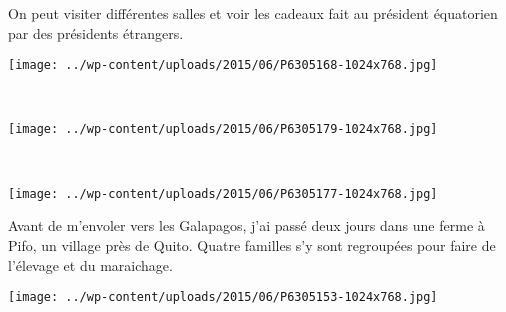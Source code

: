 On peut visiter différentes salles et voir les cadeaux fait au président équatorien par des présidents étrangers. 
\begin{center} 
\texttt{[image: ../wp-content/uploads/2015/06/P6305168-1024x768.jpg]} 
\end{center}
\vspace{-\topsep}
\pagebreak
~
\begin{center} 
\texttt{[image: ../wp-content/uploads/2015/06/P6305179-1024x768.jpg]} 
\end{center}
~\\
\begin{center} 
\texttt{[image: ../wp-content/uploads/2015/06/P6305177-1024x768.jpg]} 
\end{center}
\vspace{-\topsep}
\pagebreak

Avant de m'envoler vers les Galapagos, j'ai passé deux jours dans une ferme à Pifo, un village près de Quito. Quatre familles s'y sont regroupées pour faire de l'élevage et du maraichage.
\begin{center} 
\texttt{[image: ../wp-content/uploads/2015/06/P6305153-1024x768.jpg]} 
\end{center}